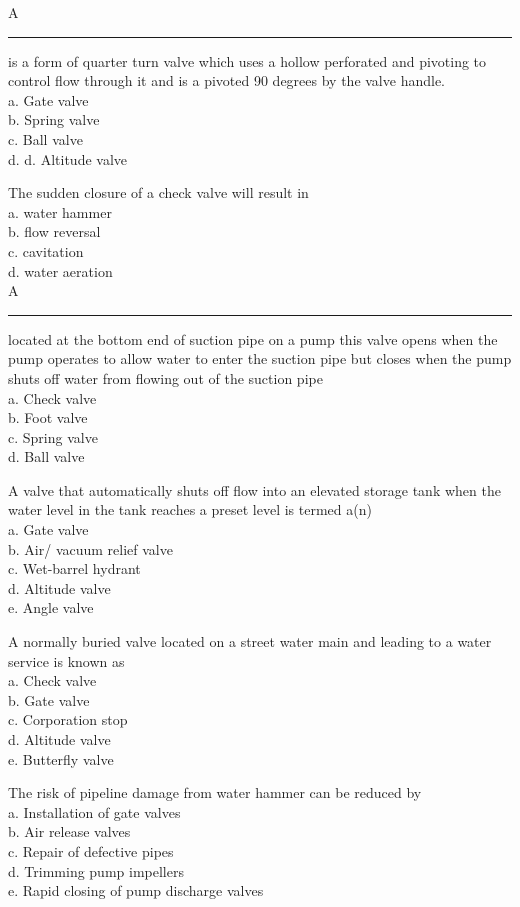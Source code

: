 A \rule{9mm}{.1pt} is a form of quarter turn valve which uses a hollow perforated and pivoting to control flow through it and is a pivoted 90 degrees by the valve handle.\\
a.	Gate valve\\
b.	Spring valve\\
c.	Ball valve\\
d.	d.  Altitude valve

The sudden closure of a check valve will result in\\
a.	water hammer\\
b.	flow reversal\\
c.	cavitation\\
d.	water aeration\\

A \rule{9mm}{.1pt} located at the bottom end of suction pipe on a pump this valve opens when the pump operates to allow water to enter the suction pipe but closes when the pump shuts off water from flowing out of the suction pipe\\
a.	Check valve\\
b.	Foot valve\\
c. 	Spring valve\\
d.	Ball valve

A valve that automatically shuts off flow into an elevated storage tank when the water level in the tank reaches a preset level is termed a(n)\\
a.	Gate valve\\
b.	Air/ vacuum relief valve\\
c.	Wet-barrel hydrant\\
d.	Altitude valve\\
e.	Angle valve

A normally buried valve located on a street water main and leading to a water service is known as\\
a.	Check valve\\
b.	Gate valve \\
c.	Corporation stop\\
d.	Altitude valve\\
e.	Butterfly valve

The risk of pipeline damage from water hammer can be reduced by\\ 
a.	Installation of gate valves\\
b.	Air release valves\\
c.	Repair of defective pipes\\
d.	Trimming pump impellers\\
e.	Rapid closing of pump discharge valves

